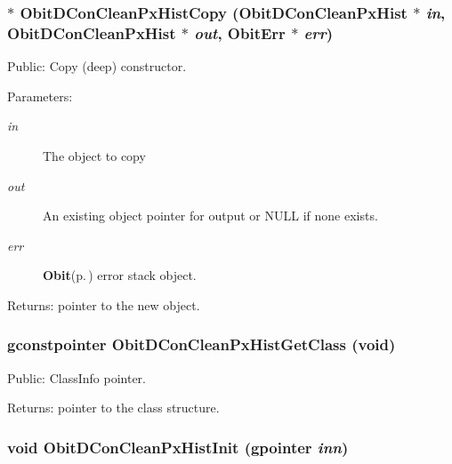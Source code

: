 \subsubsection{$\ast$ Obit\-DCon\-Clean\-Px\-Hist\-Copy ({\bf Obit\-DCon\-Clean\-Px\-Hist} $\ast$ {\em in}, {\bf Obit\-DCon\-Clean\-Px\-Hist} $\ast$ {\em out}, {\bf Obit\-Err} $\ast$ {\em err})}\label{ObitDConCleanPxHist_8c_a9}


Public: Copy (deep) constructor. 

\begin{Desc}
\item[Parameters:]
\begin{description}
\item[{\em in}]The object to copy \item[{\em out}]An existing object pointer for output or NULL if none exists. \item[{\em err}]{\bf Obit}{\rm (p.\,\pageref{structObit})} error stack object. \end{description}
\end{Desc}
\begin{Desc}
\item[Returns:]pointer to the new object. \end{Desc}
\subsubsection{\setlength{\rightskip}{0pt plus 5cm}gconstpointer Obit\-DCon\-Clean\-Px\-Hist\-Get\-Class (void)}\label{ObitDConCleanPxHist_8c_a8}


Public: Class\-Info pointer. 

\begin{Desc}
\item[Returns:]pointer to the class structure. \end{Desc}
\subsubsection{\setlength{\rightskip}{0pt plus 5cm}void Obit\-DCon\-Clean\-Px\-Hist\-Init (gpointer {\em inn})}\label{ObitDConCleanPxHist_8c_a4}


